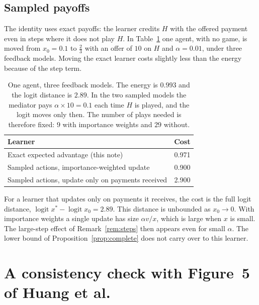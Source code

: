 \documentclass[11pt,a4paper]{article}
\theoremstyle{definition}
\theoremstyle{plain}
\newcommand{\xs}{x^{*}}
\begin{document}
\subsection{Sampled payoffs}\label{sec:feedback}

The identity uses exact payoffs: the learner credits $H$ with the offered payment even in steps where it does not play $H$. In Table~\ref{tab:feedback} one agent, with no game, is moved from $x_0=0.1$ to $\tfrac23$ with an offer of $10$ on $H$ and $\alpha=0.01$, under three feedback models. Moving the exact learner costs slightly less than the energy because of the step term.

\begin{table}[H]
\centering\small
\begin{tabular}{lr}
\toprule
Learner & Cost\\
\midrule
Exact expected advantage (this note) & 0.971\\
Sampled actions, importance-weighted update & 0.900\\
Sampled actions, update only on payments received & 2.900\\
\bottomrule
\end{tabular}
\caption{One agent, three feedback models. The energy is $0.993$ and the logit distance is $2.89$. In the two sampled models the mediator pays $\alpha\times10=0.1$ each time $H$ is played, and the logit moves only then. The number of plays needed is therefore fixed: $9$ with importance weights and $29$ without.}\label{tab:feedback}
\end{table}

For a learner that updates only on payments it receives, the cost is the full logit distance, $\operatorname{logit}\xs-\operatorname{logit}x_0=2.89$. This distance is unbounded as $x_0\to0$. With importance weights a single update has size $\alpha v/x$, which is large when $x$ is small. The large-step effect of Remark~\ref{rem:steps} then appears even for small $\alpha$. The lower bound of Proposition~\ref{prop:complete} does not carry over to this learner.

\section{A consistency check with Figure~5 of Huang et al.}\label{sec:bench}
\end{document}
